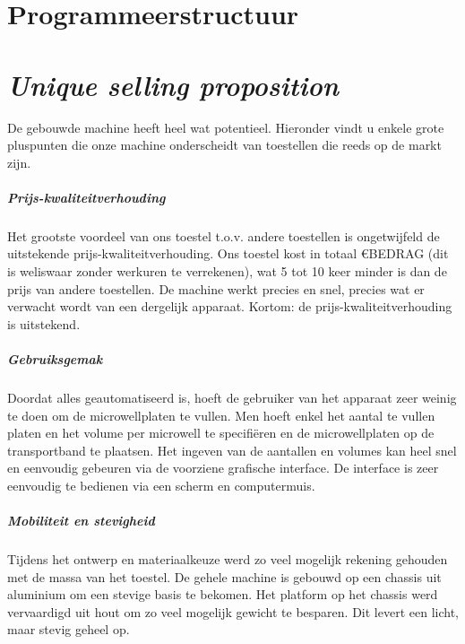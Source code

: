 \documentclass[a4paper,twoside,kulak]{kulakreport} %
\begin{document}
\chapter{Programmeerstructuur}

\chapter{\textit{Unique selling proposition}}

De gebouwde machine heeft heel wat potentieel. Hieronder vindt u enkele grote pluspunten die onze machine onderscheidt van toestellen die reeds op de markt zijn.

\paragraph{Prijs-kwaliteitverhouding}

Het grootste voordeel van ons toestel t.o.v. andere toestellen is ongetwijfeld de uitstekende prijs-kwaliteitverhouding. Ons toestel kost in totaal \euro BEDRAG (dit is weliswaar zonder werkuren te verrekenen), wat 5 tot 10 keer minder is dan de prijs van andere toestellen. De machine werkt precies en snel, precies wat er verwacht wordt van een dergelijk apparaat. Kortom: de prijs-kwaliteitverhouding is uitstekend.

\paragraph{Gebruiksgemak}

Doordat alles geautomatiseerd is, hoeft de gebruiker van het apparaat zeer weinig te doen om de microwellplaten te vullen. Men hoeft enkel het aantal te vullen platen en het volume per microwell te specifiëren en de microwellplaten op de transportband te plaatsen. Het ingeven van de aantallen en volumes kan heel snel en eenvoudig gebeuren via de voorziene grafische interface. De interface is zeer eenvoudig te bedienen via een scherm en computermuis.

\paragraph{Mobiliteit en stevigheid}

Tijdens het ontwerp en materiaalkeuze werd zo veel mogelijk rekening gehouden met de massa van het toestel. De gehele machine is gebouwd op een chassis uit aluminium om een stevige basis te bekomen. Het platform op het chassis werd vervaardigd uit hout om zo veel mogelijk gewicht te besparen. Dit levert een licht, maar stevig geheel op. 
\end{document}
